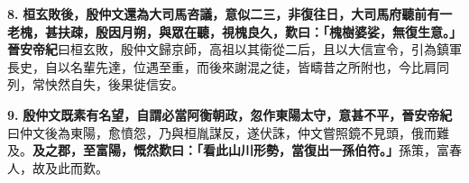 \textbf{8.} \textbf{桓玄敗後，殷仲文還為大司馬咨議，意似二三，非復往日，大司馬府聽前有一老槐，甚扶疎，殷因月朔，與眾在聽，視槐良久，歎曰：「槐樹婆娑，無復生意。」}{\footnotesize \textbf{晉安帝紀}曰桓玄敗，殷仲文歸京師，高祖以其衛從二后，且以大信宣令，引為鎮軍長史，自以名輩先達，位遇至重，而後來謝混之徒，皆疇昔之所附也，今比肩同列，常怏然自失，後果徙信安。}

\textbf{9.} \textbf{殷仲文既素有名望，自謂必當阿衡朝政，忽作東陽太守，意甚不平，}{\footnotesize \textbf{晉安帝紀}曰仲文後為東陽，愈憤怨，乃與桓胤謀反，遂伏誅，仲文嘗照鏡不見頭，俄而難及。}\textbf{及之郡，至富陽，慨然歎曰：「看此山川形勢，當復出一孫伯符。」}{\footnotesize 孫策，富春人，故及此而歎。}